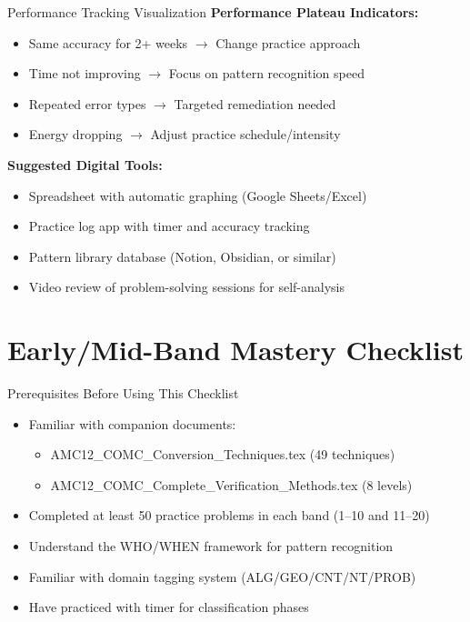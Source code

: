 \documentclass{article}
\begin{document}
\begin{analysisbox}{Performance Tracking Visualization}
\textbf{Performance Plateau Indicators:}
\begin{itemize}[nosep]
\item Same accuracy for 2+ weeks $\rightarrow$ Change practice approach
\item Time not improving $\rightarrow$ Focus on pattern recognition speed
\item Repeated error types $\rightarrow$ Targeted remediation needed
\item Energy dropping $\rightarrow$ Adjust practice schedule/intensity
\end{itemize}

\textbf{Suggested Digital Tools:}
\begin{itemize}[nosep]
\item Spreadsheet with automatic graphing (Google Sheets/Excel)
\item Practice log app with timer and accuracy tracking
\item Pattern library database (Notion, Obsidian, or similar)
\item Video review of problem-solving sessions for self-analysis
\end{itemize}
\end{analysisbox}

\newpage

\section{Early/Mid-Band Mastery Checklist}

\begin{masterybox}{Prerequisites Before Using This Checklist}
\begin{itemize}[nosep]
\item[$\square$] Familiar with companion documents:
  \begin{itemize}[nosep]
  \item[$\square$] AMC12\_COMC\_Conversion\_Techniques.tex (49 techniques)
  \item[$\square$] AMC12\_COMC\_Complete\_Verification\_Methods.tex (8 levels)
  \end{itemize}
\item[$\square$] Completed at least 50 practice problems in each band (1--10 and 11--20)
\item[$\square$] Understand the WHO/WHEN framework for pattern recognition
\item[$\square$] Familiar with domain tagging system (ALG/GEO/CNT/NT/PROB)
\item[$\square$] Have practiced with timer for classification phases
\end{itemize}
\end{masterybox}
\end{document}

